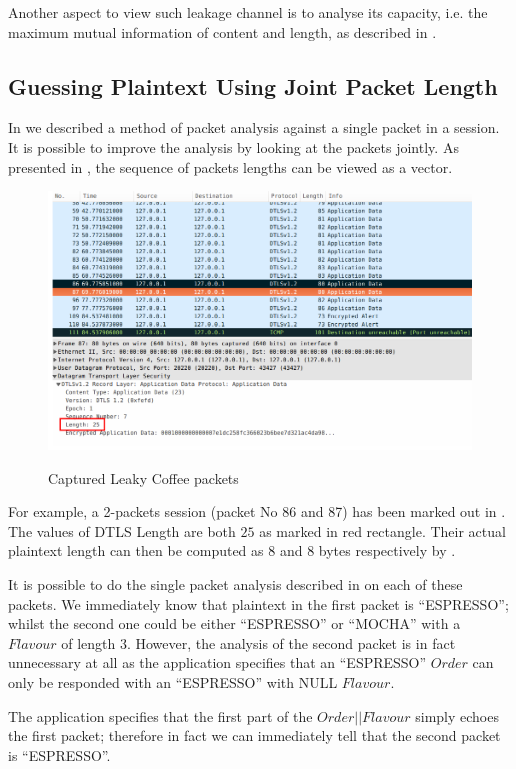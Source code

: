 Another aspect to view such leakage channel is to analyse its capacity, i.e. the maximum mutual information of content and length, as described in \cite{Web2}.

\subsection{Guessing Plaintext Using Joint Packet Length} \label{Sec: Guessing Plaintext Using Joint Packet Length}
 In  we described a method of packet analysis against a single packet in a session. It is possible to improve the analysis by looking at the packets jointly. As presented in \cite{Web2}, the sequence of packets lengths can be viewed as a vector.

\begin{example}
\begin{figure}[H] 
\centering
\resizebox{14cm}{!}
{\includegraphics{./Pics/Wireshark01.png}}
\caption{Captured Leaky Coffee packets}
\label{Fig: Captured Packets 01}
\end{figure}

For example, a 2-packets session (packet No 86 and 87) has been marked out in . The values of DTLS Length  are both $25$ as marked in red rectangle. Their actual plaintext length can then be computed as $8$ and $8$ bytes respectively by . 

It is possible to do the single packet analysis described in  on each of these packets. We immediately know that plaintext in the first packet is “ESPRESSO”; whilst the second one could be either “ESPRESSO” or “MOCHA” with a $Flavour$ of length $3$. However, the analysis of the second packet is in fact unnecessary at all as the application specifies that an “ESPRESSO” $Order$ can only be responded with an “ESPRESSO” with NULL $Flavour$.

The application specifies that the first part of the $Order||Flavour$ simply echoes the first packet; therefore in fact we can immediately tell that the second packet is “ESPRESSO”.
\end{example}

